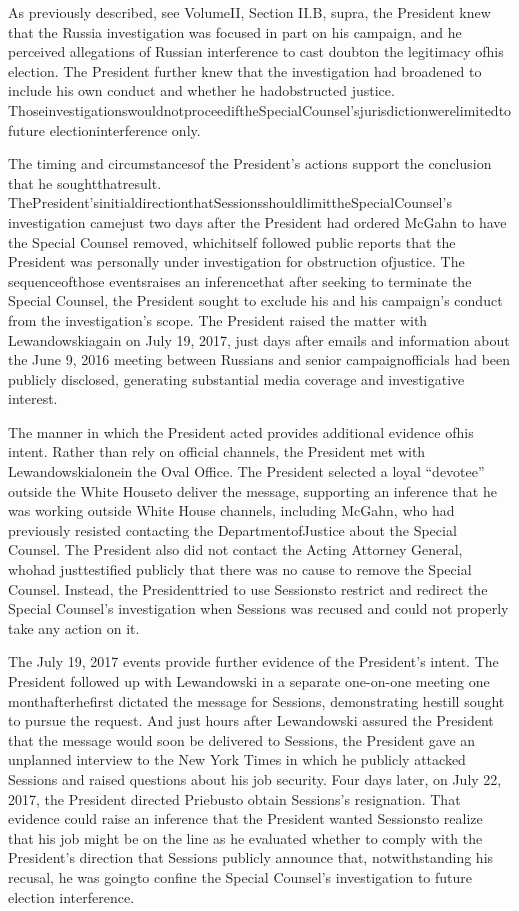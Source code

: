 {As previously described, see VolumeII, Section II.B, supra, the President knew that the Russia investigation was focused in part on his campaign, and he perceived allegations of Russian interference to cast doubton the legitimacy ofhis election. The President further knew that the investigation had broadened to include his own conduct and whether he hadobstructed justice. ThoseinvestigationswouldnotproceediftheSpecialCounsel’sjurisdictionwerelimitedtofuture electioninterference only.

The timing and circumstancesof the President’s actions support the conclusion that he soughtthatresult. ThePresident’sinitialdirectionthatSessionsshouldlimittheSpecialCounsel’s investigation camejust two days after the President had ordered McGahn to have the Special Counsel removed, whichitself followed public reports that the President was personally under investigation for obstruction ofjustice. The sequenceofthose eventsraises an inferencethat after seeking to terminate the Special Counsel, the President sought to exclude his and his campaign’s conduct from the investigation’s scope. The President raised the matter with Lewandowskiagain on July 19, 2017, just days after emails and information about the June 9, 2016 meeting between Russians and senior campaignofficials had been publicly disclosed, generating substantial media coverage and investigative interest.

The manner in which the President acted provides additional evidence ofhis intent. Rather than rely on official channels, the President met with Lewandowskialonein the Oval Office. The President selected a loyal “devotee” outside the White Houseto deliver the message, supporting an inference that he was working outside White House channels, including McGahn, who had previously resisted contacting the DepartmentofJustice about the Special Counsel. The President also did not contact the Acting Attorney General, whohad justtestified publicly that there was no cause to remove the Special Counsel. Instead, the Presidenttried to use Sessionsto restrict and redirect the Special Counsel’s investigation when Sessions was recused and could not properly take any action on it.

The July 19, 2017 events provide further evidence of the President’s intent. The President followed up with Lewandowski in a separate one-on-one meeting one monthafterhefirst dictated the message for Sessions, demonstrating hestill sought to pursue the request. And just hours after Lewandowski assured the President that the message would soon be delivered to Sessions, the President gave an unplanned interview to the New York Times in which he publicly attacked Sessions and raised questions about his job security. Four days later, on July 22, 2017, the President directed Priebusto obtain Sessions’s resignation. That evidence could raise an inference that the President wanted Sessionsto realize that his job might be on the line as he evaluated whether to comply with the President’s direction that Sessions publicly announce that, notwithstanding his recusal, he was goingto confine the Special Counsel’s investigation to future election interference.

}

